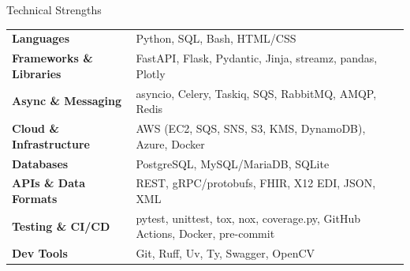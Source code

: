 

\begin{rSection}{Technical Strengths}

\begin{tabular}{ @{} >{\bfseries}l @{\hspace{6ex}} l }
Languages                & Python, SQL, Bash, HTML/CSS \\
Frameworks \& Libraries  & FastAPI, Flask, Pydantic, Jinja, streamz, pandas, Plotly \\
Async \& Messaging       & asyncio, Celery, Taskiq, SQS, RabbitMQ, AMQP, Redis \\
Cloud \& Infrastructure  & AWS (EC2, SQS, SNS, S3, KMS, DynamoDB), Azure, Docker \\
Databases                & PostgreSQL, MySQL/MariaDB, SQLite \\
APIs \& Data Formats     & REST, gRPC/protobufs, FHIR, X12 EDI, JSON, XML \\
Testing \& CI/CD         & pytest, unittest, tox, nox, coverage.py, GitHub Actions, Docker, pre-commit \\
Dev Tools                & Git, Ruff, Uv, Ty, Swagger, OpenCV
\end{tabular}

\end{rSection}
